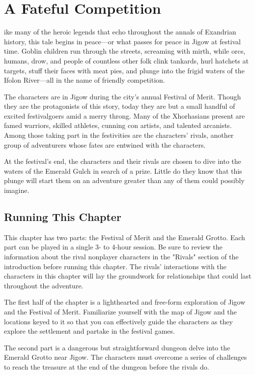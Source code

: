 \documentclass[10pt,a4paper,twoside,fancy,bg=print,twocolumn,openany,nodeprecatedcode]{dndbook}
\begin{document}
\chapter{A Fateful Competition}
ike many of the heroic legends that echo throughout the annals of Exandrian history, this tale begins in peace—or what passes for peace in Jigow at festival time. Goblin children run through the streets, screaming with mirth, while orcs, humans, drow, and people of countless other folk clink tankards, hurl hatchets at targets, stuff their faces with meat pies, and plunge into the frigid waters of the Ifolon River—all in the name of friendly competition.


The characters are in Jigow during the city's annual Festival of Merit. Though they are the protagonists of this story, today they are but a small handful of excited festivalgoers amid a merry throng. Many of the Xhorhasians present are famed warriors, skilled athletes, cunning con artists, and talented arcanists. Among those taking part in the festivities are the characters' rivals, another group of adventurers whose fates are entwined with the characters.

At the festival's end, the characters and their rivals are chosen to dive into the waters of the Emerald Gulch in search of a prize. Little do they know that this plunge will start them on an adventure greater than any of them could possibly imagine.

\section{Running This Chapter}
This chapter has two parts: the Festival of Merit and the Emerald Grotto. Each part can be played in a single 3- to 4-hour session. Be sure to review the information about the rival nonplayer characters in the "Rivals" section of the introduction before running this chapter. The rivals' interactions with the characters in this chapter will lay the groundwork for relationships that could last throughout the adventure.

The first half of the chapter is a lighthearted and free-form exploration of Jigow and the Festival of Merit. Familiarize yourself with the map of Jigow and the locations keyed to it so that you can effectively guide the characters as they explore the settlement and partake in the festival games.

The second part is a dangerous but straightforward dungeon delve into the Emerald Grotto near Jigow. The characters must overcome a series of challenges to reach the treasure at the end of the dungeon before the rivals do.
\end{document}
